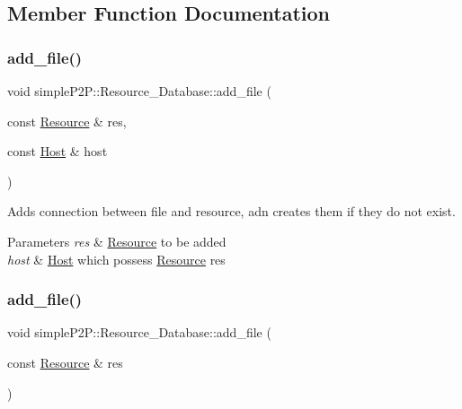 \subsection{Member Function Documentation}
\mbox{\label{classsimpleP2P_1_1Resource__Database_a7afdd297b15fb225b61f9d52e2ab9cc6}} 
\subsubsection{\texorpdfstring{add\+\_\+file()}{add\_file()}\hspace{0.1cm}{\footnotesize\ttfamily [1/2]}}
{\footnotesize\ttfamily void simple\+P2\+P\+::\+Resource\+\_\+\+Database\+::add\+\_\+file (\begin{DoxyParamCaption}\item[{const \hyperlink{classsimpleP2P_1_1Resource}{Resource} \&}]{res,  }\item[{const \hyperlink{classsimpleP2P_1_1Host}{Host} \&}]{host }\end{DoxyParamCaption})}



Adds connection between file and resource, adn creates them if they do not exist. 


\begin{DoxyParams}{Parameters}
{\em res} & \hyperlink{classsimpleP2P_1_1Resource}{Resource} to be added \\
\hline
{\em host} & \hyperlink{classsimpleP2P_1_1Host}{Host} which possess \hyperlink{classsimpleP2P_1_1Resource}{Resource} res \\
\hline
\end{DoxyParams}
\mbox{\label{classsimpleP2P_1_1Resource__Database_a8ac7f42f7de6f3281974d2be7f1ea8e8}} 
\subsubsection{\texorpdfstring{add\+\_\+file()}{add\_file()}\hspace{0.1cm}{\footnotesize\ttfamily [2/2]}}
{\footnotesize\ttfamily void simple\+P2\+P\+::\+Resource\+\_\+\+Database\+::add\+\_\+file (\begin{DoxyParamCaption}\item[{const \hyperlink{classsimpleP2P_1_1Resource}{Resource} \&}]{res }\end{DoxyParamCaption})}



